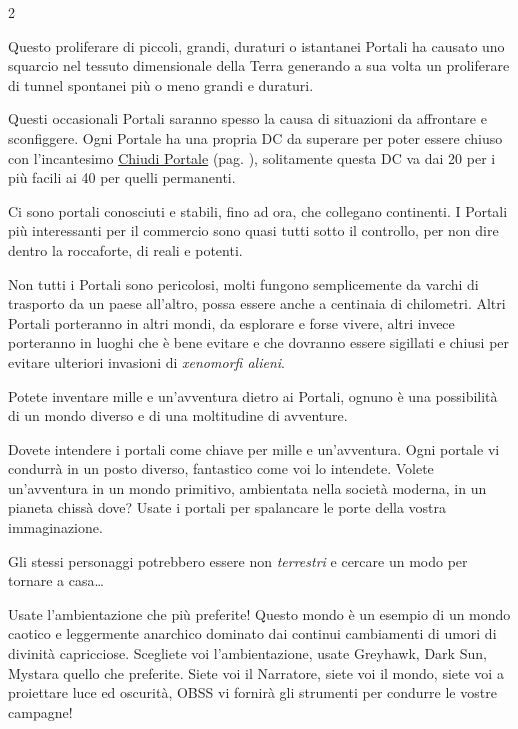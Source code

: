 \begin{multicols}{2}

Questo proliferare di piccoli, grandi, duraturi o istantanei Portali ha causato uno squarcio nel tessuto dimensionale della Terra generando a sua volta un proliferare di tunnel spontanei più o meno grandi e duraturi.

Questi occasionali Portali saranno spesso la causa di situazioni da affrontare e sconfiggere. Ogni Portale ha una propria DC da superare per poter essere chiuso con l'incantesimo \hyperlink{Chiudi Portale}{Chiudi Portale} (pag. \pageref{Chiudi Portale}), solitamente questa DC va dai 20 per i più facili ai 40 per quelli permanenti.

Ci sono portali conosciuti e stabili, fino ad ora, che collegano continenti. I Portali più interessanti per il commercio sono quasi tutti sotto il controllo, per non dire dentro la roccaforte, di reali e potenti.

Non tutti i Portali sono pericolosi, molti fungono semplicemente da varchi di trasporto da un paese all'altro, possa essere anche a centinaia di chilometri. Altri Portali porteranno in altri mondi, da esplorare e forse vivere, altri invece porteranno in luoghi che è bene evitare e che dovranno essere sigillati e chiusi per evitare ulteriori invasioni di \emph{xenomorfi alieni}.

Potete inventare mille e un'avventura dietro ai Portali, ognuno è una possibilità di un mondo diverso e di una moltitudine di avventure.

\begin{narratore}[I Portali]
Dovete intendere i portali come chiave per mille e un'avventura. Ogni portale vi condurrà in un posto diverso, fantastico come voi lo intendete. Volete un'avventura in un mondo primitivo, ambientata nella società moderna, in un pianeta chissà dove? Usate i portali per spalancare le porte della vostra immaginazione.

Gli stessi personaggi potrebbero essere non \emph{terrestri} e cercare un modo per tornare a casa…
\end{narratore}

\begin{narratore}[Ambientazione]
Usate l'ambientazione che più preferite! Questo mondo è un esempio di un mondo caotico e leggermente anarchico dominato dai continui cambiamenti di umori di divinità capricciose.
Scegliete voi l'ambientazione, usate Greyhawk, Dark Sun, Mystara quello che preferite. Siete voi il Narratore, siete voi il mondo, siete voi a proiettare luce ed oscurità, OBSS vi fornirà gli strumenti per condurre le vostre campagne!

\end{narratore}

%

\end{multicols}

